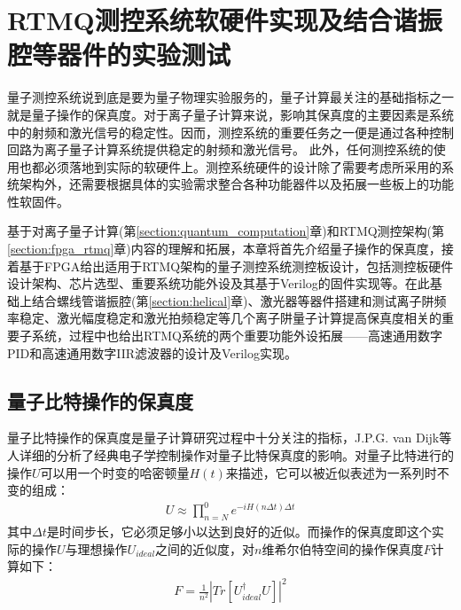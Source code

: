 

\chapter[RTMQ测控系统软硬件实现及结合谐振腔等器件的实验测试]{RTMQ测控系统软硬件实现及结合谐振腔等器件的实验测试\label{section:implementation}}

量子测控系统说到底是要为量子物理实验服务的，量子计算最关注的基础指标之一就是量子操作的保真度。对于离子量子计算来说，影响其保真度的主要因素是系统中的射频和激光信号的稳定性。因而，测控系统的重要任务之一便是通过各种控制回路为离子量子计算系统提供稳定的射频和激光信号。
此外，任何测控系统的使用也都必须落地到实际的软硬件上。测控系统硬件的设计除了需要考虑所采用的系统架构外，还需要根据具体的实验需求整合各种功能器件以及拓展一些板上的功能性软固件。

基于对离子量子计算(第\ref{section:quantum_computation}章)和RTMQ测控架构(第\ref{section:fpga_rtmq}章)内容的理解和拓展，本章将首先介绍量子操作的保真度，接着基于FPGA给出适用于RTMQ架构的量子测控系统测控板设计，包括测控板硬件设计架构、芯片选型、重要系统功能外设及其基于Verilog的固件实现等。在此基础上结合螺线管谐振腔(第\ref{section:helical}章)、激光器等器件搭建和测试离子阱频率稳定、激光幅度稳定和激光拍频稳定等几个离子阱量子计算提高保真度相关的重要子系统，过程中也给出RTMQ系统的两个重要功能外设拓展——高速通用数字PID和高速通用数字IIR滤波器的设计及Verilog实现。






\section[量子比特操作的保真度]{量子比特操作的保真度}


量子比特操作的保真度是量子计算研究过程中十分关注的指标，J.P.G. van Dijk等人\cite[]{van_Dijk_Kawakami_Schouten_Veldhorst_Vandersypen_Babaie_Charbon_Sebastiano_2019}详细的分析了经典电子学控制操作对量子比特保真度的影响。对量子比特进行的操作$U$可以用一个时变的哈密顿量$H(t)$来描述，它可以被近似表述为一系列时不变的组成：
\begin{align}
    U\approx \prod_{n=N}^{0} e^{-iH(n\Delta t)\Delta t}
\end{align}
其中$\Delta t$是时间步长，它必须足够小以达到良好的近似。而操作的保真度即这个实际的操作$U$与理想操作$U_{ideal}$之间的近似度，对$n$维希尔伯特空间的操作保真度$F$计算如下：
\begin{align}
    F=\frac{1}{n^2}\left|Tr\left[U_{ideal}^{\dagger}U\right]\right|^2
\end{align}

